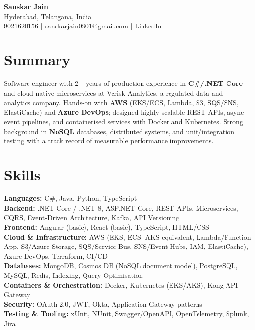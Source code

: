 \documentclass[letterpaper,10pt]{article}
\begin{document}
\begin{center}
    {\LARGE \textbf{Sanskar Jain}} \\
    Hyderabad, Telangana, India \\
    \href{tel:9021620156}{9021620156} \;|\;
    \href{mailto:sanskarjain0901@gmail.com}{sanskarjain0901@gmail.com} \;|\;
    \href{https://www.linkedin.com/in/sanskar-jain0901/}{LinkedIn}
\end{center}

\vspace{3pt}

\section*{Summary}
Software engineer with 2+ years of production experience in \textbf{C\#/.NET Core} and cloud-native microservices at Verisk Analytics, a regulated data and analytics company.
Hands-on with \textbf{AWS} (EKS/ECS, Lambda, S3, SQS/SNS, ElastiCache) and \textbf{Azure DevOps}; designed highly scalable REST APIs, async event pipelines, and containerised services with Docker and Kubernetes.
Strong background in \textbf{NoSQL} databases, distributed systems, and unit/integration testing with a track record of measurable performance improvements.

\section*{Skills}
\textbf{Languages:} C\#, Java, Python, TypeScript \\
\textbf{Backend:} .NET Core / .NET 8, ASP.NET Core, REST APIs, Microservices, CQRS, Event-Driven Architecture, Kafka, API Versioning \\
\textbf{Frontend:} Angular (basic), React (basic), TypeScript, HTML/CSS \\
\textbf{Cloud \& Infrastructure:} AWS (EKS, ECS, AKS-equivalent, Lambda/Function App, S3/Azure Storage, SQS/Service Bus, SNS/Event Hubs, IAM, ElastiCache), Azure DevOps, Terraform, CI/CD \\
\textbf{Databases:} MongoDB, Cosmos DB (NoSQL document model), PostgreSQL, MySQL, Redis, Indexing, Query Optimisation \\
\textbf{Containers \& Orchestration:} Docker, Kubernetes (EKS/AKS), Kong API Gateway \\
\textbf{Security:} OAuth 2.0, JWT, Okta, Application Gateway patterns \\
\textbf{Testing \& Tooling:} xUnit, NUnit, Swagger/OpenAPI, OpenTelemetry, Splunk, Jira
\end{document}

